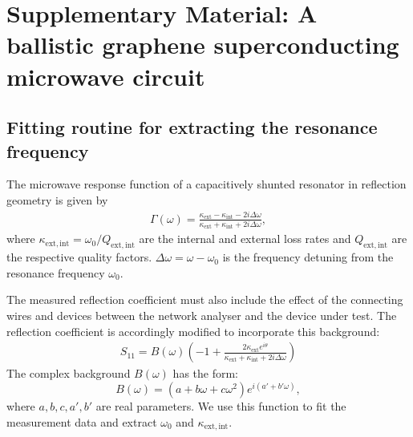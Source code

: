 \clearpage
\section{Supplementary Material: A ballistic graphene superconducting microwave circuit}



\subsection{Fitting routine for extracting the resonance frequency}\label{sec:fitting}
\noindent The microwave response function of a capacitively shunted resonator in reflection geometry is given by \cite{pozar_microwave_2012}
\begin{eqnarray}
\Gamma(\omega) = \frac{\kappa_\mathrm{ext}-\kappa_\mathrm{int}-2i\Delta\omega}{\kappa_\mathrm{ext}+\kappa_\mathrm{int}+2i\Delta\omega},
\end{eqnarray}
where $\kappa_\mathrm{ext,int}=\omega_0/Q_\mathrm{ext,int}$ are the internal and external loss rates and $Q_\mathrm{ext,int}$ are the respective quality factors.
$\Delta\omega=\omega-\omega_0$ is the frequency detuning from the resonance frequency $\omega_0$.

The measured reflection coefficient must also include the effect of the connecting wires and devices between the network analyser and the device under test.
The reflection coefficient is accordingly modified to incorporate this background:
\begin{eqnarray}
S_{11} = B(\omega)\left(-1 + \frac{2\kappa_\mathrm{ext}e^{i\theta}}{\kappa_\mathrm{ext}+\kappa_\mathrm{int}+2i\Delta\omega}\right)
\end{eqnarray}
The complex background $B(\omega)$ has the form:
\begin{equation}
B(\omega) = (a+b\omega+c\omega^2)e^{i(a'+b'\omega)},
\end{equation}
where $a,b,c,a',b'$ are real parameters.  We use this function to fit the measurement data and extract $\omega_0$ and $\kappa_\mathrm{ext,int}$.

